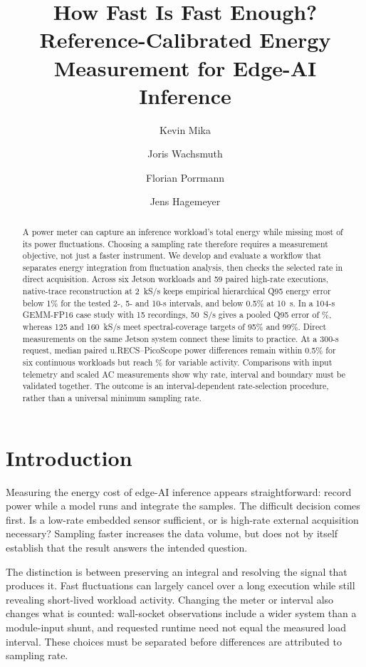 \documentclass[a4paper,UKenglish,cleveref,autoref]{oasics-v2021}
\title{How Fast Is Fast Enough? Reference-Calibrated Energy Measurement for Edge-AI Inference}
\author{Kevin Mika}
{CITEC -- Bielefeld University, Inspiration 1, 33619 Bielefeld, Germany}
{kmika@techfak.uni-bielefeld.de}
{https://orcid.org/0009-0005-2717-5147}
{}
\author{Joris Wachsmuth}
{CITEC -- Bielefeld University, Inspiration 1, 33619 Bielefeld, Germany}
{}
{}
{}
\author{Florian Porrmann}
{CITEC -- Bielefeld University, Inspiration 1, 33619 Bielefeld, Germany}
{fporrmann@techfak.uni-bielefeld.de}
{https://orcid.org/0000-0003-2401-7862}
{}
\author{Jens Hagemeyer}
{CITEC -- Bielefeld University, Inspiration 1, 33619 Bielefeld, Germany}
{jhagemey@techfak.uni-bielefeld.de}
{https://orcid.org/0009-0005-9943-8081}
{}
\newcommand{\urecs}{u.RECS}
\begin{document}
\maketitle


\begin{abstract}
A power meter can capture an inference workload's total energy while missing most of its power fluctuations. Choosing a sampling rate therefore requires a measurement objective, not just a faster instrument. We develop and evaluate a workflow that separates energy integration from fluctuation analysis, then checks the selected rate in direct acquisition. Across six Jetson workloads and 59 paired high-rate executions, native-trace reconstruction at 2~kS/s keeps empirical hierarchical Q95 energy error below 1\% for the tested 2-, 5- and 10-s intervals, and below 0.5\% at 10~s. In a 104-s GEMM-FP16 case study with 15 recordings, 50~S/s gives a pooled Q95 error of \FinalFPFifty\%, whereas 125 and 160~kS/s meet spectral-coverage targets of 95\% and 99\%. Direct measurements on the same Jetson system connect these limits to practice. At a 300-s request, median paired \urecs{}--PicoScope power differences remain within 0.5\% for six continuous workloads but reach \ParmaVariableUrecsRounded\% for variable activity. Comparisons with input telemetry and scaled AC measurements show why rate, interval and boundary must be validated together. The outcome is an interval-dependent rate-selection procedure, rather than a universal minimum sampling rate.
\end{abstract}

\section{Introduction}
Measuring the energy cost of edge-AI inference appears straightforward: record power while a model runs and integrate the samples. The difficult decision comes first. Is a low-rate embedded sensor sufficient, or is high-rate external acquisition necessary? Sampling faster increases the data volume, but does not by itself establish that the result answers the intended question.

The distinction is between preserving an integral and resolving the signal that produces it. Fast fluctuations can largely cancel over a long execution while still revealing short-lived workload activity. Changing the meter or interval also changes what is counted: wall-socket observations include a wider system than a module-input shunt, and requested runtime need not equal the measured load interval. These choices must be separated before differences are attributed to sampling rate.
\end{document}
